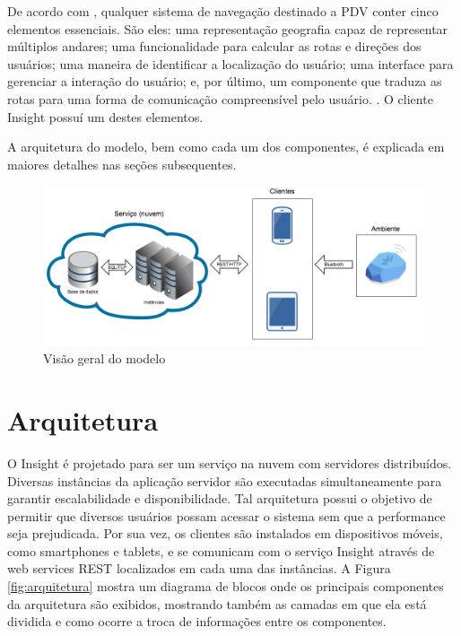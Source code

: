 \documentclass[english,brazilian]{UNISINOSmonografia}
\begin{document}
De acordo com , qualquer sistema de navegação destinado a PDV conter cinco elementos essenciais. São eles: uma representação geografia capaz de representar múltiplos andares; uma funcionalidade para calcular as rotas e direções dos usuários; uma maneira de identificar a localização do usuário; uma interface para gerenciar a interação do usuário; e, por último, um componente que traduza as rotas para uma forma de comunicação compreensível pelo usuário. \cite{gedawy2011designing}. O cliente Insight possuí um destes elementos.

A arquitetura do modelo, bem como cada um dos componentes, é explicada em maiores detalhes nas seções subsequentes.

\begin{figure}[!ht]
	\caption{Visão geral do modelo}
	\label{fig:visaoGeral}
	\centering%
	\begin{minipage}{.8\textwidth}
		\includegraphics[width=\textwidth]{imgs/visaoGeral}
	\end{minipage}
\end{figure}

	\section{Arquitetura}
O Insight é projetado para ser um serviço na nuvem com servidores distribuídos. Diversas instâncias da aplicação servidor são executadas simultaneamente para garantir escalabilidade e disponibilidade. Tal arquitetura possui o objetivo de permitir que diversos usuários possam acessar o sistema sem que a performance seja prejudicada. Por sua vez, os clientes são instalados em dispositivos móveis, como smartphones e tablets, e se comunicam com o serviço Insight através de web services REST localizados em cada uma das instâncias. A Figura \ref{fig:arquitetura} mostra um diagrama de blocos onde os principais componentes da arquitetura são exibidos, mostrando também as camadas em que ela está dividida e como ocorre a troca de informações entre os componentes. 
\end{document}
